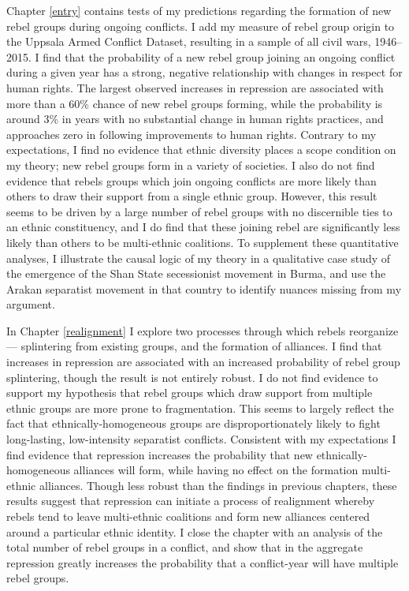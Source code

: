 \documentclass[12pt,]{book}
\theoremstyle{definition}
\theoremstyle{definition}
\theoremstyle{definition}
\theoremstyle{remark}
\begin{document}
Chapter \ref{entry} contains tests of my predictions regarding the
formation of new rebel groups during ongoing conflicts. I add my measure
of rebel group origin to the Uppsala Armed Conflict Dataset, resulting
in a sample of all civil wars, 1946--2015. I find that the probability
of a new rebel group joining an ongoing conflict during a given year has
a strong, negative relationship with changes in respect for human
rights. The largest observed increases in repression are associated with
more than a 60\% chance of new rebel groups forming, while the
probability is around 3\% in years with no substantial change in human
rights practices, and approaches zero in following improvements to human
rights. Contrary to my expectations, I find no evidence that ethnic
diversity places a scope condition on my theory; new rebel groups form
in a variety of societies. I also do not find evidence that rebels
groups which join ongoing conflicts are more likely than others to draw
their support from a single ethnic group. However, this result seems to
be driven by a large number of rebel groups with no discernible ties to
an ethnic constituency, and I do find that these joining rebel are
significantly less likely than others to be multi-ethnic coalitions. To
supplement these quantitative analyses, I illustrate the causal logic of
my theory in a qualitative case study of the emergence of the Shan State
secessionist movement in Burma, and use the Arakan separatist movement
in that country to identify nuances missing from my argument.

In Chapter \ref{realignment} I explore two processes through which
rebels reorganize --- splintering from existing groups, and the
formation of alliances. I find that increases in repression are
associated with an increased probability of rebel group splintering,
though the result is not entirely robust. I do not find evidence to
support my hypothesis that rebel groups which draw support from multiple
ethnic groups are more prone to fragmentation. This seems to largely
reflect the fact that ethnically-homogeneous groups are
disproportionately likely to fight long-lasting, low-intensity
separatist conflicts. Consistent with my expectations I find evidence
that repression increases the probability that new
ethnically-homogeneous alliances will form, while having no effect on
the formation multi-ethnic alliances. Though less robust than the
findings in previous chapters, these results suggest that repression can
initiate a process of realignment whereby rebels tend to leave
multi-ethnic coalitions and form new alliances centered around a
particular ethnic identity. I close the chapter with an analysis of the
total number of rebel groups in a conflict, and show that in the
aggregate repression greatly increases the probability that a
conflict-year will have multiple rebel groups.
\end{document}
